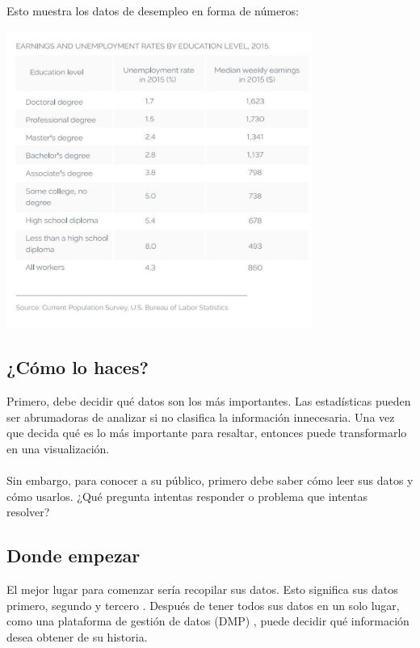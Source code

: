 \documentclass[preprint,12pt]{elsarticle}
\begin{document}
Esto muestra los datos de desempleo en forma de números:\\

	\begin{center}
		\includegraphics[width=10cm]{./Imagenes/ejemplo2}
	\end{center}

\subsection{¿Cómo lo haces?}	

Primero, debe decidir qué datos son los más importantes. Las estadísticas pueden ser abrumadoras de analizar si no clasifica la información innecesaria. Una vez que decida qué es lo más importante para resaltar, entonces puede transformarlo en una visualización.\\
\\
Sin embargo, para conocer a su público, primero debe saber cómo leer sus datos y cómo usarlos. ¿Qué pregunta intentas responder o problema que intentas resolver?\\

\subsection{Donde empezar}	

El mejor lugar para comenzar sería recopilar sus datos. Esto significa sus datos primero, segundo y tercero . Después de tener todos sus datos en un solo lugar, como una plataforma de gestión de datos (DMP) , puede decidir qué información desea obtener de su historia.\\
\end{document}
